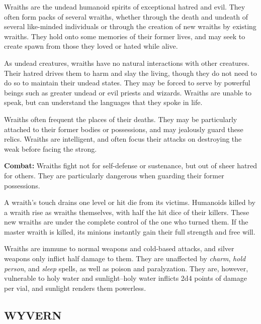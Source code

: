 \begin{multicols}{2}
Wraiths are the undead humanoid spirits of exceptional hatred and evil. They often form packs of several wraiths, whether through the death and undeath of several like-minded individuals or through the creation of new wraiths by existing wraiths. They hold onto some memories of their former lives, and may seek to create spawn from those they loved or hated while alive. 

As undead creatures, wraiths have no natural interactions with other creatures. Their hatred drives them to harm and slay the living, though they do not need to do so to maintain their undead states. They may be forced to serve by powerful beings such as greater undead or evil priests and wizards. Wraiths are unable to speak, but can understand the languages that they spoke in life.

Wraiths often frequent the places of their deaths. They may be particularly attached to their former bodies or possessions, and may jealously guard these relics. Wraiths are intelligent, and often focus their attacks on destroying the weak before facing the strong.

\textbf{Combat:} Wraiths fight not for self-defense or sustenance, but out of sheer hatred for others. They are particularly dangerous when guarding their former possessions.

A wraith's touch drains one level or hit die from its victims. Humanoids killed by a wraith rise as wraiths themselves, with half the hit dice of their killers. These new wraiths are under the complete control of the one who turned them. If the master wraith is killed, its minions instantly gain their full strength and free will.

Wraiths are immune to normal weapons and cold-based attacks, and silver weapons only inflict half damage to them. They are unaffected by \textit{charm}, \textit{hold person}, and \textit{sleep} spells, as well as poison and paralyzation. They are, however, vulnerable to holy water and sunlight--holy water inflicts 2d4 points of damage per vial, and sunlight renders them powerless.

\noindent
\begin{minipage}{\columnwidth}

\vspace{1em}

\subsection{WYVERN}


\end{minipage}
\end{multicols}
